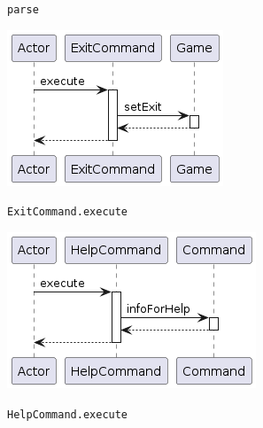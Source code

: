 \documentclass[../DocumentoOficial.tex]{subfiles}
\begin{document}
\begin{sprint}[2]
\begin{center}
\texttt{parse}
\end{center}
\begin{center}
\includegraphics[scale=0.5]{ExitCommand_execute.png}

\texttt{ExitCommand.execute}
\end{center}
\begin{center}
\includegraphics[scale=0.5]{HelpCommand_execute.png}

\texttt{HelpCommand.execute}


\end{center}
\end{sprint}
\end{document}
